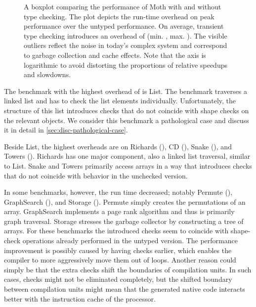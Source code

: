 \begin{figure}[htb]
  \centering
	\TypingOverhead{}
	\caption{A boxplot comparing the performance of Moth
  with and without type checking.
  The plot depicts the run-time overhead on peak performance over
  the untyped performance. On average, transient type checking introduces
  an overhead of \OverheadTypingGMeanP (min. \OverheadTypingMinP, max. \OverheadTypingMaxP).
  The visible outliers reflect the noise in today's complex system
  and correspond \eg to garbage collection and cache effects.
  Note that the axis is logarithmic to avoid distorting the proportions
  of relative speedups and slowdowns.}
	\label{fig:typing-overhead}
\end{figure}


The benchmark with the highest overhead of \OverheadListP is List.
The benchmark traverses a linked list and
has to check the list elements individually.
Unfortunately, the structure of this list introduces checks
that do not coincide with shape checks on the relevant objects.
We consider this benchmark a pathological case and discuss it
in detail in \cref{sec:disc-pathological-case}.

Beside List, the highest overheads are on
Richards (\OverheadRichardsP), CD (\OverheadCDP),
Snake (\OverheadSnakeP), and Towers (\OverheadTowersP).
Richards has one major component, also a linked list traversal,
similar to List.
Snake and Towers primarily access arrays in a way that introduces checks
that do not coincide with behavior in the unchecked version.


In some benchmarks, however, the run time decreased; notably Permute (\OverheadPermuteP),
GraphSearch (\OverheadGraphSearchP), and Storage (\OverheadStorageP).
Permute simply creates the permutations of an array.
GraphSearch implements a page rank algorithm
and thus is primarily graph traversal.
Storage stresses the garbage collector by constructing a tree of arrays.
For these benchmarks the introduced checks seem to coincide with shape-check operations
already performed in the untyped version.
The performance improvement is possibly caused by having checks earlier,
which enables the compiler to more aggressively move them out of loops.
Another reason could simply be that the extra checks shift the boundaries
of compilation units.
In such cases, checks might not be eliminated completely,
but the shifted boundary between compilation units might mean that
the generated native code interacts better with
the instruction cache of the processor.


